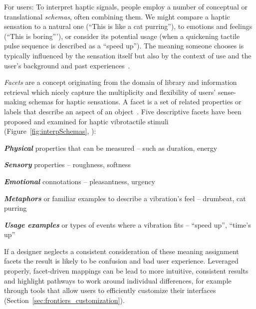 For users:
To interpret haptic signals, people employ a number of conceptual or translational  \textit{schemas}, often combining them.  %
We might compare a haptic sensation to a natural one (``This is like a cat purring''), 
 to emotions and feelings (``This is boring'''), or
consider its potential usage (when a quickening tactile pulse sequence is described as a ``speed up''). 
%
The meaning someone chooses is typically influenced by the sensation itself but also by the context of use and the user's background and past experiences~\cite{seifi2015vibviz, schneider2014improvising, Obrist2013}. 

    
\textit{Facets} are a concept originating from the domain of library and information retrieval which nicely capture the multiplicity and flexibility of users' sense-making schemas for haptic sensations. A facet is a set of related properties or labels that describe an aspect of an object~\cite{facetedbrowsing2010}. Five descriptive facets have been proposed and examined for haptic vibrotactile stimuli (Figure~\ref{fig:interpSchemas}, \cite{seifi2015vibviz}):
 
    \textit{\textbf{Physical}} properties that can be measured -- such as duration, energy
    
    \textit{\textbf{Sensory}} properties -- roughness, softness
    
    \textit{\textbf{Emotional}} connotations -- pleasantness, urgency 
        
    \textit{\textbf{Metaphors}} or familiar examples to describe a vibration's feel -- drumbeat, cat purring
    
    \textit{\textbf{Usage examples}} or types of events where a vibration fits -- ``speed up'', ``time's up''

\vspace{0.05in} 
\noindent
If a designer neglects a consistent consideration of these meaning assignment facets %
the result is likely to be confusion and bad user experience.
Leveraged properly, facet-driven 
mappings can be lead to more intuitive, consistent results and highlight pathways to work around individual differences, for example through tools that allow users to efficiently customize their interfaces (Section~\ref{sec:frontiers_customization}).


